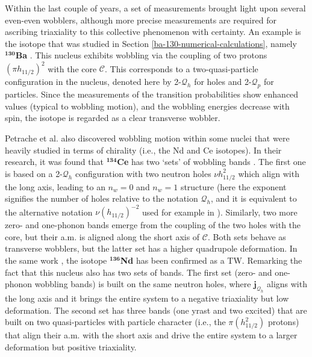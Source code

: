 Within the last couple of years, a set of measurements brought light upon several even-even wobblers, although more precise measurements are required for ascribing triaxiality to this collective phenomenon with certainty. An example is the isotope that was studied in Section \ref{ba-130-numerical-calculations}, namely $^\mathbf{130}$\textbf{Ba} \cite{petrache2019diversity,chen2019transverse,wang2020two}. This nucleus exhibits wobbling via the coupling of two protons $(\pi h_{11/2})^2$ with the core $\mathscr{C}$. This corresponds to a two-quasi-particle configuration in the nucleus, denoted here by 2-$\mathcal{Q}_h$ for holes and 2-$\mathcal{Q}_p$ for particles. Since the measurements of the transition probabilities show enhanced values (typical to wobbling motion), and the wobbling energies decrease with spin, the isotope is regarded as a clear transverse wobbler. 

Petrache et al. also discovered wobbling motion within some nuclei that were heavily studied in terms of chirality (i.e., the Nd and Ce isotopes). In their research, it was found that $^\mathbf{134}$\textbf{Ce} has two `sets' of wobbling bands \cite{petrache2016transverse}. The first one is based on a 2-$\mathcal{Q}_h$ configuration with two neutron holes $\nu h_{11/2}^2$ which align with the long axis, leading to an $n_w=0$ and $n_w=1$ structure (here the exponent signifies the number of holes relative to the notation $\mathcal{Q}_h$, and it is equivalent to the alternative notation $\nu(h_{11/2})^{-2}$ used for example in \cite{petrache2012tilted,lv2018evolution,chen2021microscopic}). Similarly, two more zero- and one-phonon bands emerge from the coupling of the two holes with the core, but their a.m. is aligned along the short axis of $\mathscr{C}$. Both sets behave as transverse wobblers, but the latter set has a higher quadrupole deformation. In the same work \cite{petrache2016transverse}, the isotope $\mathbf{^{136}}$\textbf{Nd} has been confirmed as a TW. Remarking the fact that this nucleus also has two sets of bands. The first set (zero- and one-phonon wobbling bands) is built on the same neutron holes, where $\mathbf{j}_{\mathcal{Q}_h}$ aligns with the long axis and it brings the entire system to a negative triaxiality but low deformation. The second set has three bands (one yrast and two excited) that are built on two quasi-particles with particle character (i.e., the $\pi(h_{11/2}^2)$ protons) that align their a.m. with the short axis and drive the entire system to a larger deformation but positive triaxiality.

